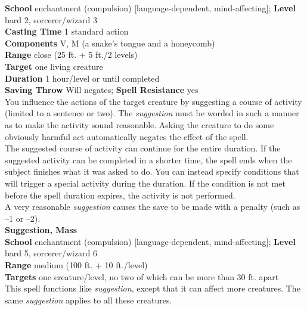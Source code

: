 \textbf{School} enchantment (compulsion) [language-dependent, mind-affecting]; \textbf{Level} bard 2, sorcerer/wizard 3\\
\textbf{Casting Time} 1 standard action\\
\textbf{Components} V, M (a snake's tongue and a honeycomb)\\
\textbf{Range} close (25 ft. + 5 ft./2 levels)\\
\textbf{Target} one living creature\\
\textbf{Duration} 1 hour/level or until completed\\
\textbf{Saving Throw }Will negates; \textbf{Spell Resistance} yes\\
You influence the actions of the target creature by suggesting a course of activity (limited to a sentence or two). The \textit{suggestion }must be worded in such a manner as to make the activity sound reasonable. Asking the creature to do some obviously harmful act automatically negates the effect of the spell. \\
The suggested course of activity can continue for the entire duration. If the suggested activity can be completed in a shorter time, the spell ends when the subject finishes what it was asked to do. You can instead specify conditions that will trigger a special activity during the duration. If the condition is not met before the spell duration expires, the activity is not performed.\\
A very reasonable \textit{suggestion }causes the save to be made with a penalty (such as --1 or --2).\\
\textbf{Suggestion, Mass}\\
\textbf{School} enchantment (compulsion) [language-dependent, mind-affecting]; \textbf{Level} bard 5, sorcerer/wizard 6\\
\textbf{Range }medium (100 ft. + 10 ft./level)\\
\textbf{Targets} one creature/level, no two of which can be more than 30 ft. apart\\
This spell functions like \textit{suggestion}, except that it can affect more creatures. The same \textit{suggestion }applies to all these creatures.\\
